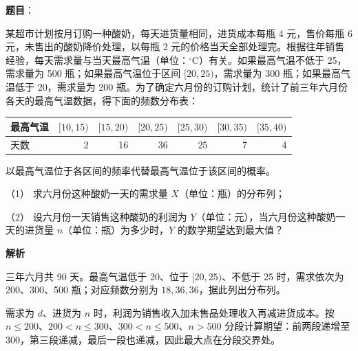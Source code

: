 \begin{answer}

\textbf{题目}：

某超市计划按月订购一种酸奶，每天进货量相同，进货成本每瓶 4 元，售价每瓶 6 元，未售出的酸奶降价处理，以每瓶 2 元的价格当天全部处理完。根据往年销售经验，每天需求量与当天最高气温（单位：\(^\circ\mathrm C\)）有关。如果最高气温不低于 25，需求量为 500 瓶；如果最高气温位于区间 \([20,25)\)，需求量为 300 瓶；如果最高气温低于 20，需求量为 200 瓶。为了确定六月份的订购计划，统计了前三年六月份各天的最高气温数据，得下面的频数分布表：

\begin{center}
\begin{tabular}{lrrrrrr}
\toprule
最高气温 & \([10,15)\) & \([15,20)\) & \([20,25)\) & \([25,30)\) & \([30,35)\) & \([35,40)\) \\
\midrule
天数 & 2 & 16 & 36 & 25 & 7 & 4 \\
\bottomrule
\end{tabular}
\end{center}

   以最高气温位于各区间的频率代替最高气温位于该区间的概率。

   （1） 求六月份这种酸奶一天的需求量 \(X\)（单位：瓶）的分布列；

   （2） 设六月份一天销售这种酸奶的利润为 \(Y\)（单位：元），当六月份这种酸奶一天的进货量 \(n\)（单位：瓶）为多少时，\(Y\) 的数学期望达到最大值？

\textbf{解析}


三年六月共 90 天。最高气温低于 20、位于 \([20,25)\)、不低于 25 时，需求依次为 200、300、500 瓶；对应频数分别为 \(18,36,36\)，据此列出分布列。


需求为 \(d\)、进货为 \(n\) 时，利润为销售收入加未售品处理收入再减进货成本。按 \(n\le200\)、\(200<n\le300\)、\(300<n\le500\)、\(n>500\) 分段计算期望：前两段递增至 300，第三段递减，最后一段也递减，因此最大点在分段交界处。



\end{answer}

